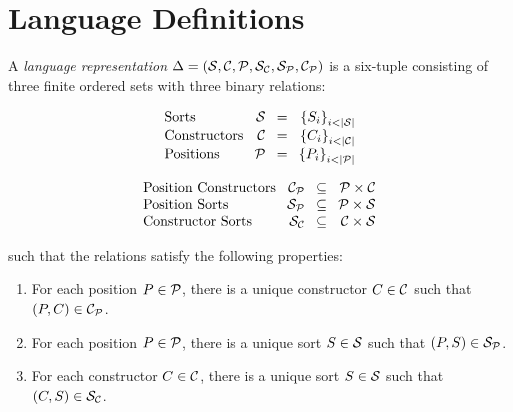 \section{Language Definitions}
\label{sec:language-definitions}

\begin{definition}
  A \emph{language representation}
  $\Delta = (\mathcal{S}, \mathcal{C}, \mathcal{P}, \mathcal{S}_{\mathcal{C}}, \mathcal{S}_{\mathcal{P}}, \mathcal{C}_{\mathcal{P}})$
  is a six-tuple consisting of three finite ordered sets with three binary relations:

  \begin{minipage}{.48\linewidth}
    \[
      \arraycolsep=4pt
      \begin{array}{lrcr}
        \text{Sorts}        & \Sorts        & = & \Setof{S_i}_{i < |\Sorts| }        \\
        \text{Constructors} & \Constructors & = & \Setof{C_i}_{i < |\Constructors| } \\
        \text{Positions}    & \Positions    & = & \Setof{P_i}_{i < |\Positions| }    \\
      \end{array}
    \]
  \end{minipage}
  \hfil
  \begin{minipage}{.48\linewidth}
    \[
      \arraycolsep=4pt
      \begin{array}{lrcr}
        \text{Position Constructors} & \PositionConstructors & \subseteq & \Positions \times \Constructors \\
        \text{Position Sorts}        & \PositionSorts        & \subseteq & \Positions \times \Sorts        \\
        \text{Constructor Sorts}     & \ConstructorSorts     & \subseteq & \Constructors \times \Sorts     \\
      \end{array}
    \]
  \end{minipage}
  such that the relations satisfy the following properties:
  \begin{enumerate}
    \item For each position $P \in \mathcal{P}$,
          there is a unique constructor $C \in \mathcal{C}$ such that $(P, C) \in \mathcal{C}_{\mathcal{P}}$.
    \item For each position $P \in \mathcal{P}$,
          there is a unique sort $S \in \mathcal{S}$ such that $(P, S) \in \mathcal{S}_{\mathcal{P}}$.
    \item For each constructor $C \in \mathcal{C}$,
          there is a unique sort $S \in \mathcal{S}$ such that $(C, S) \in \mathcal{S}_{\mathcal{C}}$.
  \end{enumerate}
\end{definition}

